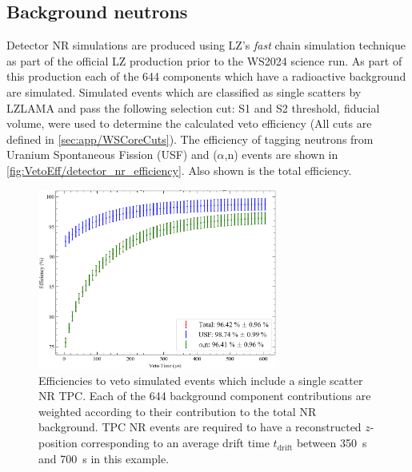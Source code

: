 \subsection{Background neutrons}\label{sec:VetoEff/BackgroundNeutrons}
Detector NR simulations are produced using LZ's \textit{fast} chain simulation technique as part of the official LZ production prior to the WS2024 science run.
As part of this production each of the 644 components which have a radioactive background are simulated.
Simulated events which are classified as single scatters by LZLAMA and pass the following selection cut: S1 and S2 threshold, fiducial volume, were used to determine the calculated veto efficiency (All cuts are defined in \autoref{sec:app/WSCoreCuts}).
The efficiency of tagging neutrons from Uranium Spontaneous Fission (USF) and ($\alpha$,n) events are shown in \autoref{fig:VetoEff/detector_nr_efficiency}. Also shown is the total efficiency.

\begin{figure}[!ht]
	\centering
	\includegraphics[width=0.7\textwidth]{figures/VetoEfficiency/det_nr_efficiency.png}
	\caption{Efficiencies to veto simulated events which include a single scatter NR TPC. Each of the 644 background component contributions are weighted according to their contribution to the total NR background. TPC NR events are required to have a reconstructed $z$-position corresponding to an average drift time $t_\text{drift}$ between 350~\textmu s and 700~\textmu s in this example.}
	\label{fig:VetoEff/detector_nr_efficiency}
\end{figure}

